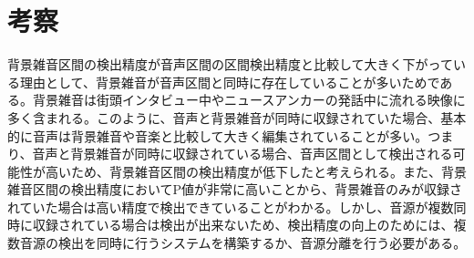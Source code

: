 \begin{comment}
次に、本研究で評価に用いたニュース音声5番組分の発話区間検出精度を表\ref{table:test_detail_RPF}に示す。

\begin{table}[H]
  \begin{center}
    \caption{発話区間検出精度 \label{table:test_detail_RPF}}
    \begin{tabular}{|c||c|c|c|} \hline
      データID & Recall & Precision & F-meature \\ \hline
      ニュース1 & 0.895 & 0.916 & 0.905 \\ \hline
      ニュース2 & 0.841 & 0.955 & 0.895\\ \hline
      ニュース3 & 0.883 & 0.860 & 0.871 \\ \hline
      ニュース4 & 0.901 & 0.833 & 0.866\\ \hline
      ニュース5 & 0.910 & 0.930 & 0.906\\ \hline
    \end{tabular}
  \end{center}
\end{table}

音声区間の検出精度は表\ref{table:NHK_speech_RPF}の結果と同様、高い精度を示した。
\end{comment}

\section{考察}
背景雑音区間の検出精度が音声区間の区間検出精度と比較して大きく下がっている理由として、背景雑音が音声区間と同時に存在していることが多いためである。背景雑音は街頭インタビュー中やニュースアンカーの発話中に流れる映像に多く含まれる。このように、音声と背景雑音が同時に収録されていた場合、基本的に音声は背景雑音や音楽と比較して大きく編集されていることが多い。つまり、音声と背景雑音が同時に収録されている場合、音声区間として検出される可能性が高いため、背景雑音区間の検出精度が低下したと考えられる。また、背景雑音区間の検出精度においてP値が非常に高いことから、背景雑音のみが収録されていた場合は高い精度で検出できていることがわかる。しかし、音源が複数同時に収録されている場合は検出が出来ないため、検出精度の向上のためには、複数音源の検出を同時に行うシステムを構築するか、音源分離を行う必要がある。\par

